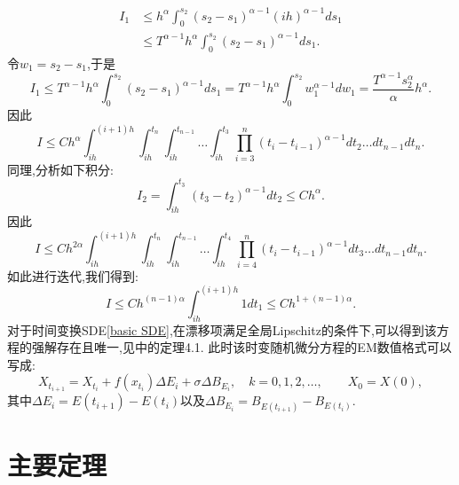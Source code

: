 \documentclass[12pt,final]{article}
\makeatletter
\numberwithin{equation}{section}
\numberwithin{figure}{section}
\numberwithin{table}{section}
\theoremstyle{plain}
\renewcommand{\proofname}{证明}
\theoremstyle{Definition}
\theoremstyle{Remark}
\renewenvironment{proof}[1][\proofname]{\par
	\pushQED{\qed}%
	\normalfont \topsep6\p@\@plus6\p@\relax
	\trivlist\item[\hskip\labelsep
	\bfseries #1\@addpunct{\,:\,}]\ignorespaces
}{%
	\popQED\endtrivlist\@endpefalse
}
\makeatother
\begin{document}
\begin{proof}
		\begin{align*}
			I_1 &\le h^{\alpha}\int_{0}^{s_{2}} (s_{2}-s_{1})^{\alpha -1} (ih)^{\alpha - 1} ds_1 \\
			&\le  T^{\alpha - 1}h^{\alpha}\int_{0}^{s_{2}} (s_{2}-s_{1})^{\alpha -1} ds_1.
		\end{align*}
		令$w_1=s_{2}-s_{1}$,于是
		\begin{equation*}
			I_1\le T^{\alpha - 1}h^{\alpha}\int_{0}^{s_{2}} (s_{2}-s_{1})^{\alpha -1} ds_1
			=  T^{\alpha - 1}h^{\alpha}\int_{0}^{s_{2}} w_1^{\alpha -1} dw_1
			=  \frac{T^{\alpha - 1}s_{2}^\alpha}{\alpha}h^{\alpha}.
		\end{equation*}
		因此
		\begin{equation*}
			I \le Ch^\alpha
			\int_{ih}^{(i+1)h}\int_{ih}^{t_n}\int_{ih}^{t_{n-1}} \ldots \int_{ih}^{t_{3}} 
			\prod_{i=3}^{n}(t_i-t_{i-1})^{\alpha -1} dt_{2} \ldots dt_{n-1}dt_n.
		\end{equation*}
		同理,分析如下积分:
		\begin{equation*}
			I_{2} = \int_{ih}^{t_{3}}(t_{3}-t_{2})^{\alpha -1}
			dt_{2} \le Ch^\alpha.
		\end{equation*}
		因此
		\begin{equation*}
			I \le Ch^{2\alpha}
			\int_{ih}^{(i+1)h}\int_{ih}^{t_n}\int_{ih}^{t_{n-1}} \ldots \int_{ih}^{t_{4}} 
			\prod_{i=4}^{n}(t_i-t_{i-1})^{\alpha -1} dt_{3} \ldots dt_{n-1}dt_n.
		\end{equation*}
		如此进行迭代,我们得到:
		\begin{equation*}
			I \le Ch^{(n-1)\alpha}\int_{ih}^{(i+1)h} 1 dt_1 \le Ch^{1+(n-1)\alpha}.
		\end{equation*}
	\end{proof}
	对于时间变换SDE\eqref{basic SDE},在漂移项满足全局Lipschitz的条件下,可以得到该方程的强解存在且唯一,见\cite{kobayashi2011stochastic}中的定理4.1. 此时该时变随机微分方程的EM数值格式可以写成:
	\begin{equation}\label{eq:1}
		X_{t_{i+1}}=X_{t_i}+f(x_{t_i})\Delta E_{i}+\sigma\Delta B_{E_{i}},\quad k=0,1,2,\ldots,\qquad X_0=X(0),
	\end{equation}
	其中$\Delta E_{i}=E(t_{i+1})-E(t_i)$以及$\Delta B_{E_{i}}=B_{E{(t_{i+1})}}-B_{E({t_i})}$. 
	
	\section{主要定理}
	
\end{document}
